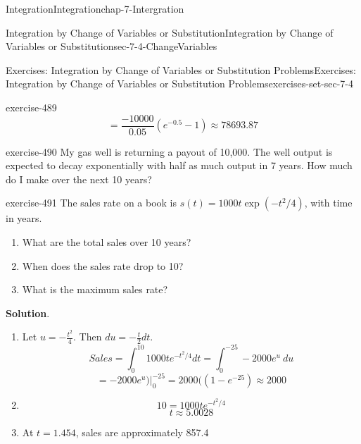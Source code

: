 \documentclass[oneside,10pt,]{book}
\numberwithin{equation}{section}
\begin{document}
\begin{chapterptx}{Integration}{}{Integration}{}{}{chap-7-Intergration}
\begin{sectionptx}{Integration by Change of Variables or Substitution}{}{Integration by Change of Variables or Substitution}{}{}{sec-7-4-ChangeVariables}
\begin{exercises-subsection-numberless}{Exercises: Integration by Change of Variables or Substitution Problems}{}{Exercises: Integration by Change of Variables or Substitution Problems}{}{}{exercises-set-sec-7-4}
\begin{divisionexercise}{21}{}{}{exercise-489}
%
\begin{equation*}
=\frac{-10000}{0.05} (e^{-0.5}-1)
\approx 78693.87
\end{equation*}
\end{divisionexercise}%
\begin{divisionexercise}{22}{}{}{exercise-490}%
\hypertarget{p-2869}{}%
My gas well is returning a payout of  \textdollar{}10,000.  The well output is expected to decay exponentially with half as much output in 7 years.  How much do I make over the next 10 years?%
\end{divisionexercise}%
\begin{divisionexercise}{23}{}{}{exercise-491}%
\hypertarget{p-2870}{}%
The sales rate on a book is \(s(t)=1000t \exp(-t^2/4)\), with time in years.%
\leavevmode%
\begin{enumerate}[label=(\alph*)]
\item\hypertarget{li-762}{}\hypertarget{p-2871}{}%
What are the total sales over 10 years?%
\item\hypertarget{li-763}{}\hypertarget{p-2872}{}%
When does the sales rate drop to 10?%
\item\hypertarget{li-764}{}\hypertarget{p-2873}{}%
What is the maximum sales rate?%
\end{enumerate}
\par\smallskip%
\noindent\textbf{Solution}.\hypertarget{solution-249}{}\quad%
\leavevmode%
\begin{enumerate}[label=(\alph*)]
\item\hypertarget{li-765}{}\hypertarget{p-2874}{}%
Let \(u=-\frac{t^2}{4}\).  Then \(du=-\frac{t}{2} dt\).%
%
\begin{equation*}
Sales=\int_0^{10} 1000t e^{-t^2/4}dt=\int_0^{-25}-2000 e^u\ du
\end{equation*}
%
\begin{equation*}
=\left.-2000e^u)\right|_0^{-25}
=2000((1-e^{-25})\approx 2000
\end{equation*}
\item\hypertarget{li-766}{}%
\begin{equation*}
10=1000t e^{-t^2/4}
\end{equation*}
%
\begin{equation*}
t\approx 5.0028
\end{equation*}
%
\item\hypertarget{li-767}{}\hypertarget{p-2875}{}%
At \(t=1.454\), sales are approximately 857.4%
\end{enumerate}
\end{divisionexercise}%

\end{exercises-subsection-numberless}
\end{sectionptx}
\end{chapterptx}
\end{document}
